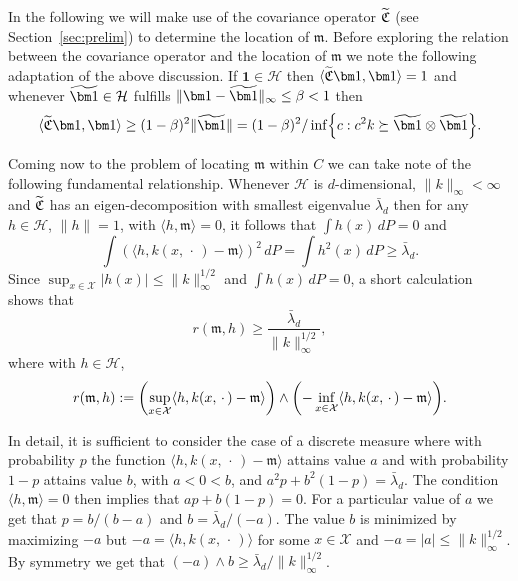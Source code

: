\documentclass[10pt]{amsart}
\theoremstyle{definition}\newtheorem{defi}[theo]{Definition}\newtheorem{rema}[theo]{Remark}\newtheorem{exam}[theo]{Example}\newtheorem{exem}[theo]{Example}\newtheorem{nota}[theo]{Notation}
\theoremstyle{remark}
\newcommand{\X}{\mathcal{X}}
\newcommand{\cH}{\mathcal{H}}
\newcommand{\fkC}{\mathfrak{C}}
\newcommand{\Cov}{\tilde{\fkC}}
\newcommand{\mean}{\mathfrak{m}}
\let\oldtilde\tilde
\renewcommand*{\tilde}[1]{\mathchoice{\widetilde{#1}}{\widetilde{#1}}{\oldtilde{#1}}{\oldtilde{#1}}}
\let\originalleft\left
\let\originalright\right
\renewcommand{\left}{\mathopen{}\mathclose\bgroup\originalleft}
\renewcommand{\right}{\aftergroup\egroup\originalright}
\begin{document}
In the following we will make use of the covariance operator $\tilde{\fkC}$ (see Section~\ref{sec:prelim}) to determine the location of $\mean$. Before exploring the relation between the covariance operator and the location of $\mean$ we note the following adaptation of the above discussion. If $\bm 1 \in \cH$ then $\langle \Cov \bm 1, \bm 1 \rangle = 1$ and whenever $\tilde{\bm 1} \in \cH$ fulfills $\|\bm 1 - \tilde{\bm 1}\|_\infty \leq \beta < 1$ then
\begin{equation}\label{lbnd:cov_op}
\langle \Cov \bm 1, \bm 1 \rangle \geq (1-\beta)^2 \|\tilde{\bm 1}\| = (1-\beta)^2/ \inf\left\{ c: c^2 k \succeq \tilde{\bm 1} \otimes \tilde{\bm 1}\right\}.
\end{equation}



Coming now to the problem of locating $\mean$ within $C$ we can take note of the following fundamental relationship. Whenever $\cH$ is $d$-dimensional, $\|k\|_\infty <\infty$ and $\tilde{\fkC}$ has an eigen-decomposition with smallest eigenvalue $\bar \lambda_d$ then for any $h \in \cH$, $\|h\|=1$, with $\langle h, \mean \rangle = 0$, it follows that $\int h(x) \, dP = 0$ and
\[
\int (\langle h, k(x,\,\cdot\,) - \mean \rangle)^2 \, dP = \int h^2(x) \, dP \geq \bar \lambda_d.
\]
Since $\sup_{x\in\X} |h(x)| \leq \|k\|_\infty^{1/2}$ and $\int h(x) \, dP = 0$, a short calculation shows that
\[
r(\mean,h) \geq \frac{\bar{\lambda}_d}{\|k\|_\infty^{1/2}},
\]
where with $h \in \cH$,
\[
r(\mean,h) := \left(\sup_{x\in \X} \langle h, k(x,\,\cdot\,) - \mean \rangle\right) \wedge \left(- \inf_{x\in \X} \langle h, k(x,\,\cdot\,) - \mean \rangle\right).
\]



In detail, it is sufficient to consider the case of a discrete measure where with probability $p$ the function $\langle h, k(x,\,\cdot\,) - \mean \rangle$ attains value $a$ and with probability $1-p$ attains value $b$, with $a < 0 < b$, and $a^2 p + b^2 (1-p) = \bar \lambda_d$. The condition $\langle h,\mean \rangle = 0$ then implies that $a p + b(1-p) = 0$. For a particular value of $a$ we get that $p=b/(b-a)$ and $b = \bar \lambda_d/(-a)$. The value $b$ is minimized by maximizing $-a$ but $-a = \langle h,k(x,\,\cdot\,) \rangle$ for some $x \in \X$ and $-a = |a| \leq \|k\|_\infty^{1/2}$. By symmetry we get that $(- a) \wedge b \geq \bar \lambda_d/\|k\|_\infty^{1/2}$.
\end{document}
